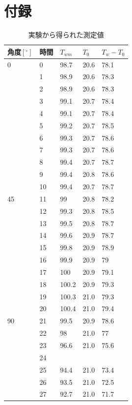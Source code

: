 \documentclass[a4paper,11pt,uplatex]{jsarticle}
\begin{document}
\section{付録}
\begin{longtable}{lllll}
\caption{実験から得られた測定値} \\
角度$[^\circ]$ & 時間 & $T_{wm}$ & $T_0$ & $T_w-T_0$ \\ \hline

\endfirsthead

0 & 0 & 98.7 & 20.6 & 78.1 \\ \hline
 & 1 & 98.9 & 20.6 & 78.3 \\ \hline
 & 2 & 98.9 & 20.6 & 78.3 \\ \hline
 & 3 & 99.1 & 20.7 & 78.4 \\ \hline
 & 4 & 99.1 & 20.7 & 78.4 \\ \hline
 & 5 & 99.2 & 20.7 & 78.5 \\ \hline
 & 6 & 99.3 & 20.7 & 78.6 \\ \hline
 & 7 & 99.3 & 20.7 & 78.6 \\ \hline
 & 8 & 99.4 & 20.7 & 78.7 \\ \hline
 & 9 & 99.4 & 20.8 & 78.6 \\ \hline
 & 10 & 99.4 & 20.7 & 78.7 \\ \hline
45 & 11 & 99 & 20.8 & 78.2 \\ \hline
 & 12 & 99.3 & 20.8 & 78.5 \\ \hline
 & 13 & 99.5 & 20.8 & 78.7 \\ \hline
 & 14 & 99.6 & 20.9 & 78.7 \\ \hline
 & 15 & 99.8 & 20.9 & 78.9 \\ \hline
 & 16 & 99.9 & 20.9 & 79 \\ \hline
 & 17 & 100 & 20.9 & 79.1 \\ \hline
 & 18 & 100.2 & 20.9 & 79.3 \\ \hline
 & 19 & 100.3 & 21.0 & 79.3 \\ \hline
 & 20 & 100.4 & 21.0 & 79.4 \\ \hline
90 & 21 & 99.5 & 20.9 & 78.6 \\ \hline
 & 22 & 98 & 21.0 & 77 \\ \hline
 & 23 & 96.6 & 21.0 & 75.6 \\ \hline
 & 24 &  &  &  \\ \hline
 & 25 & 94.4 & 21.0 & 73.4 \\ \hline
 & 26 & 93.5 & 21.0 & 72.5 \\ \hline
 & 27 & 92.7 & 21.0 & 71.7 \\ \hline

\end{longtable}
\end{document}
